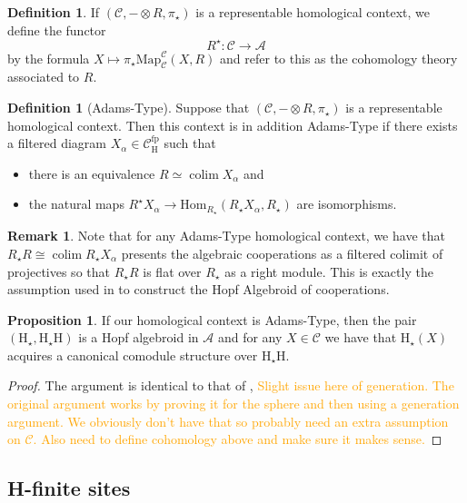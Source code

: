 \documentclass[10pt]{amsart}
\theoremstyle{definition}
\numberwithin{figure}{section}
\numberwithin{equation}{section}
\newtheorem{proposition}[figure]{Proposition}
\newtheorem{definition}[figure]{Definition}
\newtheorem{remark}[figure]{Remark}
\newcommand{\cA}{\mathcal{A}}
\newcommand{\cC}{\mathcal{C}}
\theoremstyle{cited}
\newcommand{\colim}{\operatorname{colim}}
\newcommand{\Map}{\mathrm{Map}}
\newcommand{\fp}{\mathrm{fp}}
\newcommand{\Hom}{\mathrm{Hom}}
\renewcommand{\H}{\mathrm{H}}
\begin{document}
\begin{definition}
  If $(\cC,-\otimes R,\pi_\star)$ is a representable homological context, we define the functor
  \[
  R^\star:\cC\to \cA
  \]
  by the formula $X\mapsto \pi_\star\Map_{\cC}^{\cC}(X, R)$ and refer to this as the cohomology theory associated to $R$.
\end{definition}

\begin{definition}[Adams-Type]
  Suppose that $(\cC, -\otimes R, \pi_\star)$ is a representable homological context. Then this context is in addition Adams-Type if there exists a filtered diagram $X_\alpha\in \cC^\fp_\H$ such that
  \begin{itemize}
    \item there is an equivalence $R\simeq \colim X_\alpha$ and
    \item the natural maps $R^\star X_\alpha \to \Hom_{R_\star}(R_\star X_\alpha, R_\star)$ are isomorphisms.
  \end{itemize}
\end{definition}

\begin{remark}
  Note that for any Adams-Type homological context, we have that $R_\star R\cong \colim R_\star X_\alpha$ presents the algebraic cooperations as a filtered colimit of projectives so that $R_\star R$ is flat over $R_\star$ as a right module. This is exactly the assumption used in \cite[Section 12]{BB} to construct the Hopf Algebroid of cooperations.
\end{remark}

\begin{proposition}
  If our homological context is Adams-Type, then the pair $(\H_\star, \H_\star\H)$ is a Hopf algebroid in $\cA$ and for any $X\in \cC$ we have that $\H_\star(X)$ acquires a canonical comodule structure over $\H_\star \H$.
\end{proposition}

\begin{proof}
  The argument is identical to that of \cite{BB}, \textcolor{orange}{Slight issue here of generation. The original argument works by proving it for the sphere and then using a generation argument. We obviously don't have that so probably need an extra assumption on $\cC$. Also need to define cohomology above and make sure it makes sense.}
\end{proof}

\subsection{H-finite sites}
\end{document}
